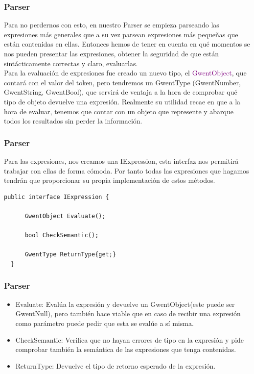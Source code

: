 \documentclass{beamer}
\begin{document}
\begin{frame}
  \frametitle{Parser}
  Para no perdernos con esto, en nuestro Parser se empieza parseando las expresiones más generales que a su vez parsean expresiones más pequeñas que están contenidas en ellas.
  Entonces hemos de tener en cuenta en qué momentos se nos pueden presentar las expresiones, obtener la seguridad de que están sintácticamente correctas y claro, evaluarlas. \\
  Para la evaluación de expresiones fue creado un nuevo tipo, el \textcolor{purple}{GwentObject}, que contará con el valor del token, pero tendremos un GwentType (GwentNumber, GwentString, GwentBool), que servirá de ventaja a la hora de comprobar qué tipo de objeto devuelve una expresión. Realmente su utilidad recae en que a la hora de evaluar, tenemos que contar con un objeto que represente y abarque todos los resultados sin perder la información.
\end{frame}


\begin{frame}[fragile]
  \frametitle{Parser}
  Para las expresiones, nos creamos una IExpression, esta interfaz nos permitirá trabajar con ellas de forma cómoda. Por tanto todas las expresiones que hagamos tendrán que proporcionar su propia implementación de estos métodos.
  \begin{lstlisting}[language=CSharp,style=MyCsharpstyle]
    public interface IExpression {

      GwentObject Evaluate();

      bool CheckSemantic();

      GwentType ReturnType{get;}
  }
  \end{lstlisting}
\end{frame}

\begin{frame}
  \frametitle{Parser}
  \begin{itemize}
    \item Evaluate: Evalúa la expresión y devuelve un GwentObject(este puede ser GwentNull), pero también hace viable que en caso de recibir una expresión como parámetro puede pedir que esta se evalúe a sí misma.
    \item CheckSemantic: Verifica que no hayan errores de tipo en la expresión y pide comprobar también la semántica de las expresiones que tenga contenidas.
    \item ReturnType: Devuelve el tipo de retorno esperado de la expresión.
  \end{itemize}
\end{frame}
\end{document}
